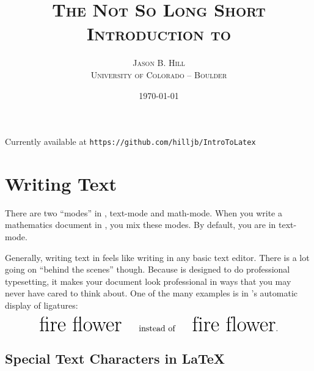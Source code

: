 \documentclass[letterpaper,twoside,10pt]{article}
\author{\textsc{Jason B. Hill}\\\textsc{\small University of Colorado -- Boulder}}
\title{\textsc{The Not So Long Short Introduction to {\LaTeXe}}}
\date{\textsc{\today}}
\begin{document}
\maketitle

\begin{center}
{\small Currently available at \texttt{https://github.com/hilljb/IntroToLatex}}
\end{center}

\tableofcontents

\thispagestyle{empty}

\newpage
\setcounter{page}{1}



\section{Writing Text}

There are two ``modes'' in \LaTeXe, text-mode and math-mode. When you write a mathematics document
in \LaTeXe, you mix these modes. By default, you are in text-mode.

\bigbreak
Generally, writing text in {\LaTeXe} feels like writing in any basic text editor. There is a lot
going on ``behind the scenes'' though. Because {\LaTeXe} is designed to do professional typesetting,
it makes your document look professional in ways that you may never have cared to think about. One
of the many examples is in {\LaTeXe}'s automatic display of ligatures:
\[
\text{{\Huge fire flower}\qquad instead of\qquad {\Huge {f}{i}re {f}{l}ower}.}
\]


\subsection{Special Text Characters in {\LaTeX}}
\end{document}
